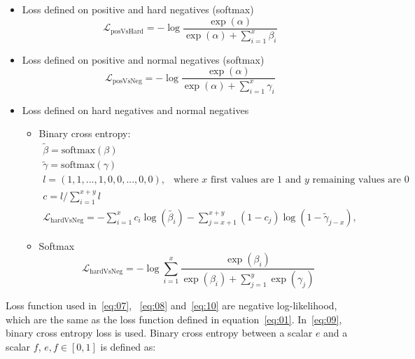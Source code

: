 \documentclass[12pt, sort&compress]{report}
\begin{document}
\begin{itemize}
	\item Loss defined on positive and hard negatives (softmax)
	\begin{equation}
		\label{eq:07}
		\mathcal{L}_{\text{posVsHard}} = -\log\dfrac{\exp\left(\alpha\right)}{\exp\left(\alpha\right) + \sum\limits_{i=1}^x\beta_i}
	\end{equation}
	\item Loss defined on positive and normal negatives (softmax)
	\begin{equation}
		\label{eq:08}
		\mathcal{L}_{\text{posVsNeg}} = -\log\dfrac{\exp\left(\alpha\right)}{\exp\left(\alpha\right) + \sum\limits_{i=1}^x\gamma_i}
	\end{equation}
	\item Loss defined on hard negatives and normal negatives
	\begin{itemize}
		\item Binary cross entropy:
		\begin{equation}
			\label{eq:09}
			\begin{array}{l}
				\tilde{\beta} = \text{softmax}(\beta) \\
				\tilde{\gamma} = \text{softmax}(\gamma) \\ 
				l = (1, 1, ..., 1, 0, 0, ... ,0, 0),\:\: \text{ where } x \text{ first values are 1 and } y \text{ remaining values are 0 } \\
				c = l / \sum\limits_{i=1}^{x + y} l \\
				\mathcal{L}_{\text{hardVsNeg}} = -\sum\limits_{i=1}^x c_i\log\left(\tilde{\beta_i}\right) - \sum\limits_{j=x+1}^{x+y}(1 - c_j)\log(1-\tilde{\gamma}_{j-x}),
			\end{array}
		\end{equation}
		\item Softmax
		\begin{equation}
			\label{eq:10}
			\mathcal{L}_{\text{hardVsNeg}} = -\log\sum\limits_{i=1}^x\dfrac{\exp\left(\beta_i\right)}{\exp\left(\beta_i\right) + \sum\limits_{j=1}^y\exp\left(\gamma_j\right)}
		\end{equation}
	\end{itemize}
\end{itemize}
\par Loss function used in~\eqref{eq:07}, ~\eqref{eq:08} and~\eqref{eq:10} are negative log-likelihood, which are the same as the loss function defined in equation~\eqref{eq:01}. In~\eqref{eq:09}, binary cross entropy loss is used. Binary cross entropy between a scalar $e$ and a scalar $f$, $e, f \in [0, 1]$ is defined as:
\end{document}
